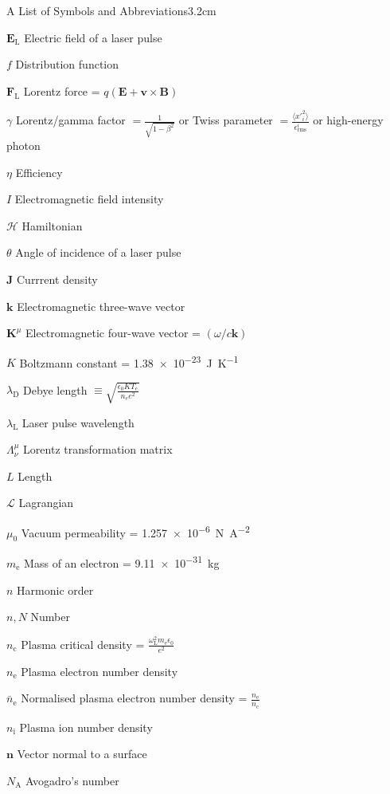 \begin{mclistof}{A List of Symbols and Abbreviations}{3.2cm}
\item[$\mathbf{E}_\mathrm{L}$] Electric field of a laser pulse
\item[$f$] Distribution function
\item[$\mathbf{F}_\mathrm{L}$] Lorentz force = $q(\mathbf{E}+ \mathbf{v}\times \mathbf{B})$
\item[$\gamma$] Lorentz/gamma factor $= \frac{1}{\sqrt{1-\beta^2}}$ or Twiss parameter $= \frac{\langle x'^2_i\rangle}{\epsilon^i_\mathrm{rms}}$ or high-energy photon
\item[$\eta$] Efficiency
\item[$I$] Electromagnetic field intensity
\item[$\mathcal{H}$] Hamiltonian
\item[$\theta$] Angle of incidence of a laser pulse
\item[$\mathbf{J}$] Currrent density
\item[$\mathbf{k}$] Electromagnetic three-wave vector
\item[$\mathbf{K}^\mu$] Electromagnetic four-wave vector = $(\omega/c \mathbf{k})$
\item[$K$] Boltzmann constant = \qty{1.38e-23}{J.K^{-1}}
\item[$\lambda_\mathrm{D}$] Debye length $\equiv \sqrt{\frac{\epsilon_0KT_e}{n_ee^2}}$
\item[$\lambda_\mathrm{L}$] Laser pulse wavelength
\item[$\Lambda^\mu_\nu$] Lorentz transformation matrix
\item[$L$] Length 
\item[$\mathcal{L}$] Lagrangian
\item[$\mu_0$] Vacuum permeability = \qty{1.257e-6}{N.A^{-2}}
\item[$m_\mathrm{e}$] Mass of an electron = \qty{9.11e-31}{kg}
\item[$n$] Harmonic order
\item[$n,N$] Number
\item[$n_\mathrm{c}$] Plasma critical density = $\frac{\omega^2_\mathrm{L}m_\mathrm{e}\epsilon_0}{e^2}$
\item[$n_\mathrm{e}$] Plasma electron number density
\item[$\bar{n}_\mathrm{e}$] Normalised plasma electron number density = $\frac{n_\mathrm{e}}{n_\mathrm{c}}$
\item[$n_\mathrm{i}$] Plasma ion number density
\item[$\mathbf{n}$] Vector normal to a surface
\item[$N_\mathrm{A}$] Avogadro's number

\end{mclistof}
